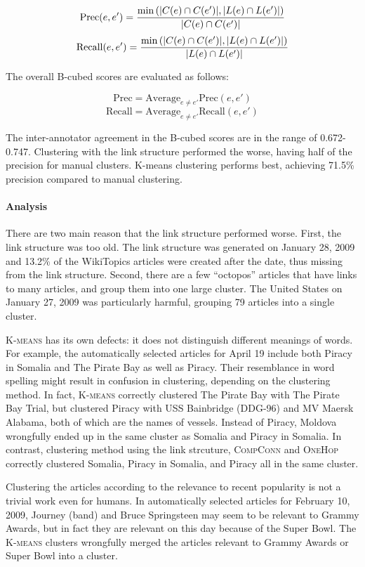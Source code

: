 \documentclass[11pt]{article}
\newcommand{\war}[1]{{\sf\small #1}}
\begin{document}
$$ \mbox{Prec}(e,e') = { \min \left( |C(e) \cap C(e')| , |L(e) \cap L(e')| \right) \over |C(e) \cap C(e')| } $$
$$ \mbox{Recall}(e,e') = { \min \left( |C(e) \cap C(e')| , |L(e) \cap L(e')| \right) \over |L(e) \cap L(e')| } $$

The overall B-cubed scores are evaluated as follows:

$$ \mbox{Prec} = \mbox{Average} _{e \neq e'} \mbox{Prec}(e,e') $$
$$ \mbox{Recall} = \mbox{Average} _{e \neq e'} \mbox{Recall}(e,e') $$

The inter-annotator agreement in the B-cubed scores are in the range of 0.672-0.747.
Clustering with the link structure performed the worse, having half of the precision
for manual clusters.
K-means clustering performs best, achieving 71.5\% precision compared to 
manual clustering.

\paragraph{Analysis}

There are two main reason that the link structure performed worse.
First, the link structure was too old. The link structure was generated on
January 28, 2009 and 13.2\% of the WikiTopics articles were created after the date,
thus missing from the link structure. Second, there are a few ``octopos'' articles
that have links to many articles, and group them into one large cluster.
\war{The United States} on January 27, 2009 was particularly harmful,
grouping 79 articles into a single cluster.

\textsc{K-means} has its own defects: it does not distinguish different meanings of words.
For example, the automatically selected articles for April 19 include
both \war{Piracy in Somalia} and \war{The Pirate Bay} as well as \war{Piracy}.
Their resemblance in word spelling might result in confusion in clustering,
depending on the clustering method.
In fact, \textsc{K-means} correctly clustered \war{The Pirate Bay} with \war{The Pirate Bay Trial},
but clustered \war{Piracy} with \war{USS Bainbridge (DDG-96)} and \war{MV Maersk Alabama},
both of which are the names of vessels.
Instead of \war{Piracy}, \war{Moldova} wrongfully ended up in the same cluster as \war{Somalia} and \war{Piracy in Somalia}.
In contrast, clustering method using the link strcuture, \textsc{CompConn} and \textsc{OneHop} correctly clustered
\war{Somalia}, \war{Piracy in Somalia}, and {Piracy} all in the same cluster.

Clustering the articles according to the relevance to recent popularity is not a trivial work
even for humans. In automatically selected articles for February 10, 2009,
\war{Journey (band)} and \war{Bruce Springsteen} may seem to be relevant to \war{Grammy Awards},
but in fact they are relevant on this day because of the \war{Super Bowl}.
The \textsc{K-means} clusters wrongfully merged the articles relevant to \war{Grammy Awards} or \war{Super Bowl}
into a cluster.
\end{document}
